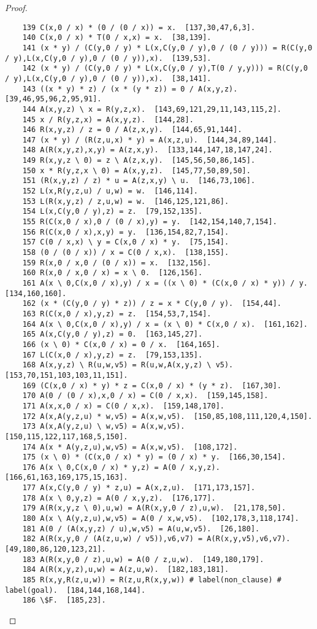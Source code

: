 \documentclass[12pt]{report}
\theoremstyle{definition}
\begin{document}
\begin{proof}
\begin{lstlisting}
    139 C(x,0 / x) * (0 / (0 / x)) = x.  [137,30,47,6,3].
    140 C(x,0 / x) * T(0 / x,x) = x.  [38,139].
    141 (x * y) / (C(y,0 / y) * L(x,C(y,0 / y),0 / (0 / y))) = R(C(y,0 / y),L(x,C(y,0 / y),0 / (0 / y)),x).  [139,53].
    142 (x * y) / (C(y,0 / y) * L(x,C(y,0 / y),T(0 / y,y))) = R(C(y,0 / y),L(x,C(y,0 / y),0 / (0 / y)),x).  [38,141].
    143 ((x * y) * z) / (x * (y * z)) = 0 / A(x,y,z).  [39,46,95,96,2,95,91].
    144 A(x,y,z) \ x = R(y,z,x).  [143,69,121,29,11,143,115,2].
    145 x / R(y,z,x) = A(x,y,z).  [144,28].
    146 R(x,y,z) / z = 0 / A(z,x,y).  [144,65,91,144].
    147 (x * y) / (R(z,u,x) * y) = A(x,z,u).  [144,34,89,144].
    148 A(R(x,y,z),x,y) = A(z,x,y).  [133,144,147,18,147,24].
    149 R(x,y,z \ 0) = z \ A(z,x,y).  [145,56,50,86,145].
    150 x * R(y,z,x \ 0) = A(x,y,z).  [145,77,50,89,50].
    151 (R(x,y,z) / z) * u = A(z,x,y) \ u.  [146,73,106].
    152 L(x,R(y,z,u) / u,w) = w.  [146,114].
    153 L(R(x,y,z) / z,u,w) = w.  [146,125,121,86].
    154 L(x,C(y,0 / y),z) = z.  [79,152,135].
    155 R(C(x,0 / x),0 / (0 / x),y) = y.  [142,154,140,7,154].
    156 R(C(x,0 / x),x,y) = y.  [136,154,82,7,154].
    157 C(0 / x,x) \ y = C(x,0 / x) * y.  [75,154].
    158 (0 / (0 / x)) / x = C(0 / x,x).  [138,155].
    159 R(x,0 / x,0 / (0 / x)) = x.  [132,156].
    160 R(x,0 / x,0 / x) = x \ 0.  [126,156].
    161 A(x \ 0,C(x,0 / x),y) / x = ((x \ 0) * (C(x,0 / x) * y)) / y.  [134,160,160].
    162 (x * (C(y,0 / y) * z)) / z = x * C(y,0 / y).  [154,44].
    163 R(C(x,0 / x),y,z) = z.  [154,53,7,154].
    164 A(x \ 0,C(x,0 / x),y) / x = (x \ 0) * C(x,0 / x).  [161,162].
    165 A(x,C(y,0 / y),z) = 0.  [163,145,27].
    166 (x \ 0) * C(x,0 / x) = 0 / x.  [164,165].
    167 L(C(x,0 / x),y,z) = z.  [79,153,135].
    168 A(x,y,z) \ R(u,w,v5) = R(u,w,A(x,y,z) \ v5).  [153,70,151,103,103,11,151].
    169 (C(x,0 / x) * y) * z = C(x,0 / x) * (y * z).  [167,30].
    170 A(0 / (0 / x),x,0 / x) = C(0 / x,x).  [159,145,158].
    171 A(x,x,0 / x) = C(0 / x,x).  [159,148,170].
    172 A(x,A(y,z,u) * w,v5) = A(x,w,v5).  [150,85,108,111,120,4,150].
    173 A(x,A(y,z,u) \ w,v5) = A(x,w,v5).  [150,115,122,117,168,5,150].
    174 A(x * A(y,z,u),w,v5) = A(x,w,v5).  [108,172].
    175 (x \ 0) * (C(x,0 / x) * y) = (0 / x) * y.  [166,30,154].
    176 A(x \ 0,C(x,0 / x) * y,z) = A(0 / x,y,z).  [166,61,163,169,175,15,163].
    177 A(x,C(y,0 / y) * z,u) = A(x,z,u).  [171,173,157].
    178 A(x \ 0,y,z) = A(0 / x,y,z).  [176,177].
    179 A(R(x,y,z \ 0),u,w) = A(R(x,y,0 / z),u,w).  [21,178,50].
    180 A(x \ A(y,z,u),w,v5) = A(0 / x,w,v5).  [102,178,3,118,174].
    181 A(0 / (A(x,y,z) / u),w,v5) = A(u,w,v5).  [26,180].
    182 A(R(x,y,0 / (A(z,u,w) / v5)),v6,v7) = A(R(x,y,v5),v6,v7).  [49,180,86,120,123,21].
    183 A(R(x,y,0 / z),u,w) = A(0 / z,u,w).  [149,180,179].
    184 A(R(x,y,z),u,w) = A(z,u,w).  [182,183,181].
    185 R(x,y,R(z,u,w)) = R(z,u,R(x,y,w)) # label(non_clause) # label(goal).  [184,144,168,144].
    186 \$F.  [185,23].
  \end{lstlisting}
\end{proof}


\end{document}
